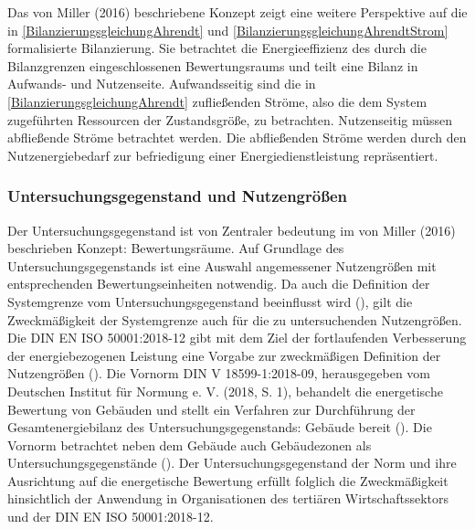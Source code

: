 Das von Miller (2016) beschriebene Konzept zeigt eine weitere Perspektive auf die in \eqref{BilanzierungsgleichungAhrendt} und \eqref{BilanzierungsgleichungAhrendtStrom} 
formalisierte Bilanzierung. 
Sie betrachtet die Energieeffizienz des durch die Bilanzgrenzen eingeschlossenen Bewertungsraums und teilt eine Bilanz in Aufwands- und Nutzenseite.
Aufwandsseitig sind die in \eqref{BilanzierungsgleichungAhrendt} zufließenden Ströme, also die dem System zugeführten Ressourcen der Zustandsgröße, zu betrachten.
Nutzenseitig müssen abfließende Ströme betrachtet werden. Die abfließenden Ströme werden durch den Nutzenergiebedarf zur befriedigung einer Energiedienstleistung 
repräsentiert. 


\subsubsection{Untersuchungsgegenstand und Nutzengrößen}

Der Untersuchungsgegenstand ist von Zentraler bedeutung im von Miller (2016) beschrieben Konzept: Bewertungsräume.
Auf Grundlage des Untersuchungsgegenstands ist eine Auswahl angemessener Nutzengrößen mit entsprechenden Bewertungseinheiten notwendig.
Da auch die Definition der Systemgrenze vom Untersuchungsgegenstand beeinflusst wird (\cite[S. 109]{Miller.2016}), gilt die Zweckmäßigkeit der Systemgrenze auch für die 
zu untersuchenden Nutzengrößen.
Die DIN EN ISO 50001:2018-12 gibt mit dem Ziel der fortlaufenden Verbesserung der energiebezogenen Leistung eine  Vorgabe zur zweckmäßigen Definition 
der Nutzengrößen (\cite[S. 11]{DIN50001.2018}).
Die Vornorm DIN V 18599-1:2018-09, herausgegeben vom Deutschen Institut für Normung e. V. (2018, S. 1), behandelt die energetische Bewertung von Gebäuden und stellt ein 
Verfahren zur Durchführung der Gesamtenergiebilanz des Untersuchungsgegenstands: Gebäude bereit (\cite[S. 9]{DIN18599.2018}). 
Die Vornorm betrachtet neben dem Gebäude auch Gebäudezonen als Untersuchungsgegenstände (\cite{DIN18599.2018}).
Der Untersuchungsgegenstand der Norm und ihre Ausrichtung auf die energetische Bewertung erfüllt folglich die Zweckmäßigkeit hinsichtlich der Anwendung in 
Organisationen des tertiären Wirtschaftssektors und der DIN EN ISO 50001:2018-12. 

